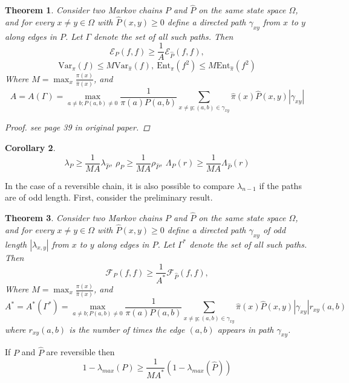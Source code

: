 \documentclass[12pt,reqno]{amsart}
\newtheorem{thm}{Theorem}[section]
\newtheorem{cor}[thm]{Corollary}
\begin{document}
\begin{thm}
  Consider two Markov chains $P$ and $\hat{P}$ on the same state space $\Omega$, and for every $x\neq y \in \Omega$ with $\hat{P}(x,y)\geq 0$ define a directed path $\gamma_{xy}$ from $x$ to $y$ along edges in $P$. Let $\Gamma$ denote the set of all such paths. Then
  \begin{equation}
    \label{eq:2.14}
    \mathcal{E}_P(f,f)\geq \frac{1}{A}\mathcal{E}_{\hat{P}}(f,f),
  \end{equation}
  \begin{equation}
    \mbox{Var}_{\pi}(f)\leq M \mbox{Var}_{\hat{\pi}}(f),~
    \mbox{Ent}_{\pi}(f^2)\leq M \mbox{Ent}_{\hat{\pi}}(f^2)
  \end{equation}
Where $M=\max_x\frac{\pi(x)}{\hat{\pi}(x)}$, and
$$
A = A(\Gamma) = \max_{a \neq b;P(a,b)\neq 0}\frac{1}{\pi(a)P(a,b)}\sum_{x\neq y;(a,b)\in \gamma_{xy}}
\hat{\pi}(x)\hat{P}(x,y)|\gamma_{xy}|
$$
\begin{proof}
  see page 39 in original paper.
\end{proof}
\end{thm}

\begin{cor}
$$  
\lambda_P\geq \frac{1}{MA}\lambda_{\hat{P}},~\rho_P\geq \frac{1}{MA}\rho_{\hat{P}},~ \Lambda_P(r)\geq \frac{1}{MA}\Lambda_{\hat{P}}(r) 
$$
\end{cor}

In the case of a reversible chain, it is also possible to compare $\lambda_{n-1}$ if the paths are of odd length. First, consider the preliminary result.

\begin{thm}
  Consider two Markov chains $P$ and $\hat{P}$ on the same state space $\Omega$, and for every $x\neq y \in \Omega$ with $\hat{P}(x,y)\geq 0$ define a directed path $\gamma_{xy}$ of odd length $|\lambda_{x,y}|$ from $x$ to $y$ along edges in $P$. Let $\Gamma^*$ denote the set of all such paths. Then
  \begin{equation}
    \label{eq:2.16}
    \mathcal{F}_P(f,f)\geq \frac{1}{A^*}\mathcal{F}_{\hat{P}}(f,f),
  \end{equation}
Where $M=\max_x\frac{\pi(x)}{\hat{\pi}(x)}$, and
$$
A^* = A^*(\Gamma^*) = \max_{a \neq b;P(a,b)\neq 0}\frac{1}{\pi(a)P(a,b)}\sum_{x\neq y;(a,b)\in \gamma_{xy}}
\hat{\pi}(x)\hat{P}(x,y)|\gamma_{xy}|r_{xy}(a,b)
$$  
where $r_{xy}(a,b)$ is the number of times the edge $(a,b)$ appears in path $\gamma_{xy}$.
\end{thm}
If $P$ and $\hat{P}$ are reversible then
$$
1 - \lambda_{max}(P) \geq \frac{1}{MA^*}(1-\lambda_{max}(\hat{P}))
$$
\end{document}
